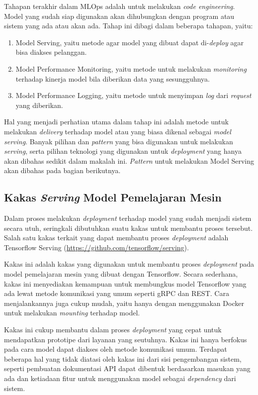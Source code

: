 Tahapan terakhir dalam MLOps adalah untuk melakukan \textit{code engineering}.
Model yang sudah siap digunakan akan dihubungkan dengan program atau sistem yang ada atau akan ada.
Tahap ini dibagi dalam beberapa tahapan, yaitu:

\begin{enumerate}
  \item Model Serving, yaitu metode agar model yang dibuat dapat di-\textit{deploy} agar bisa diakses pelanggan.
  \item Model Performance Monitoring, yaitu metode untuk melakukan \textit{monitoring} terhadap kinerja model bila diberikan data yang sesungguhnya.
  \item Model Performance Logging, yaitu metode untuk menyimpan \textit{log} dari \textit{request} yang diberikan.
\end{enumerate}

Hal yang menjadi perhatian utama dalam tahap ini adalah metode untuk melakukan \textit{delivery} terhadap model atau yang biasa dikenal sebagai \textit{model serving}.
Banyak pilihan dan \textit{pattern} yang bisa digunakan untuk melakukan \textit{serving}, serta pilihan teknologi yang digunakan untuk \textit{deployment} yang hanya akan dibahas sedikit dalam makalah ini.
\textit{Pattern} untuk melakukan Model Serving akan dibahas pada bagian berikutnya.

\subsection{Kakas \textit{Serving} Model Pemelajaran Mesin}

Dalam proses melakukan \textit{deployment} terhadap model yang sudah menjadi sistem secara utuh, seringkali dibutuhkan suatu kakas untuk membantu proses tersebut.
Salah satu kakas terkait yang dapat membantu proses \textit{deployment} adalah Tensorflow Serving (\href{https://github.com/tensorflow/serving}{https://github.com/tensorflow/serving}).

Kakas ini adalah kakas yang digunakan untuk membantu proses \textit{deployment} pada model pemelajaran mesin yang dibuat dengan Tensorflow.
Secara sederhana, kakas ini menyediakan kemampuan untuk membungkus model Tensorflow yang ada lewat metode komunikasi yang umum seperti gRPC dan REST.\@
Cara menjalankannya juga cukup mudah, yaitu hanya dengan menggunakan Docker untuk melakukan \textit{mounting} terhadap model.

Kakas ini cukup membantu dalam proses \textit{deployment} yang cepat untuk mendapatkan prototipe dari layanan yang seutuhnya.
Kakas ini hanya berfokus pada cara model dapat diakses oleh metode komunikasi umum.
Terdapat beberapa hal yang tidak diatasi oleh kakas ini dari sisi pengembangan sistem, seperti pembuatan dokumentasi API dapat dibentuk berdasarkan masukan yang ada dan ketiadaan fitur untuk menggunakan model sebagai \textit{dependency} dari sistem.
